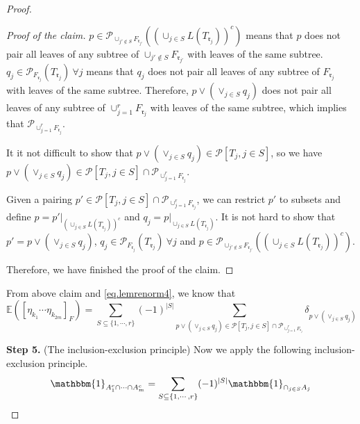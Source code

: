\begin{proof}
\begin{proof}[Proof of the claim] $p\in \mathcal{P}_{\cup_{j'\notin S} F_{\mathfrak{r}_{j'}}}((\cup_{j\in S}L(T_{\mathfrak{r}_j}))^c)$ means that $p$ does not pair all leaves of any subtree of $\cup_{j'\notin S} F_{\mathfrak{r}_{j'}}$ with leaves of the same subtree. $q_j\in 
\mathcal{P}_{F_{\mathfrak{r}_j}}(T_{\mathfrak{r}_j})\ \forall j$ means that $q_j$ does not pair all leaves of any subtree of $F_{\mathfrak{r}_j}$ with leaves of the same subtree. Therefore, $p\vee (\vee_{j\in S} q_j)$ does not pair all leaves of any subtree of $\cup_{j=1}^r F_{\mathfrak{r}_{j}}$ with leaves of the same subtree, which implies that $\mathcal{P}_{\cup_{j=1}^r F_{\mathfrak{r}_{j}}}$.

It it not difficult to show that $p\vee (\vee_{j\in S} q_j)\in \mathcal{P}[T_j,j\in S]$, so we have $p\vee (\vee_{j\in S} q_j)\in \mathcal{P}[T_j,j\in S]\cap \mathcal{P}_{\cup_{j=1}^r F_{\mathfrak{r}_{j}}}$.

Given a pairing $p'\in \mathcal{P}[T_j,j\in S]\cap \mathcal{P}_{\cup_{j=1}^r F_{\mathfrak{r}_{j}}}$, we can restrict $p'$ to subsets and define $p = p'|_{(\cup_{j\in S}L(T_{\mathfrak{r}_j}))^c}$ and $q_j = p|_{\cup_{j\in S}L(T_{\mathfrak{r}_j})}$. It is not hard to show that $p'=p\vee (\vee_{j\in S} q_j)$, $q_j\in 
\mathcal{P}_{F_{\mathfrak{r}_j}}(T_{\mathfrak{r}_j})\ \forall j$ and $p\in \mathcal{P}_{\cup_{j'\notin S} F_{\mathfrak{r}_{j'}}}((\cup_{j\in S}L(T_{\mathfrak{r}_j}))^c)$.

Therefore, we have finished the proof of the claim.
\end{proof}

From above claim and \eqref{eq.lemrenorm4}, we know that 
\begin{equation}
    \mathbb{E}([\eta_{k_1}\cdots \eta_{k_{2m}}]_F)=\sum_{S\subseteq\{1,\cdots,r\}}(-1)^{|S|}\sum_{p\vee (\vee_{j\in S} q_j)\in \mathcal{P}[T_j,j\in S]\cap \mathcal{P}_{\cup_{j=1}^r F_{\mathfrak{r}_{j}}}} 
    \delta_{p\vee (\vee_{j\in S} q_j)}
\end{equation}
    

\textbf{Step 5.} (The inclusion-exclusion principle) Now we apply the following inclusion-exclusion principle.
\begin{equation}\label{eq.inclu-exclu}
    \mathbbm{1}_{A_1^c\cap\cdots\cap A_m^c} = \sum_{S\subseteq\{1,\cdots,r\}}(-1)^{|S|} \mathbbm{1}_{\cap_{j\in S} A_j}
\end{equation}



\end{proof}
